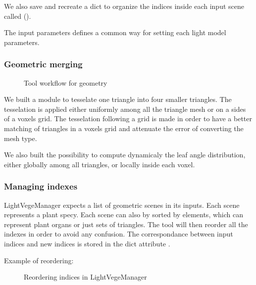 \documentclass[letterpaper,10pt,english]{sphinxmanual}
\let\sphinxpxdimen\pdfpxdimen\else\newdimen\sphinxpxdimen
\begin{document}
\sphinxAtStartPar
We also save and recreate a dict to organize the indices inside each input scene called  ({\hyperref[\detokenize{architecture:indexes}]{}}).

\sphinxAtStartPar
The input parameters defines a common way for setting each light model parameters.


\subsubsection{Geometric merging}
\label{\detokenize{architecture:geometric-merging}}
\begin{figure}[htbp]
\centering
\capstart

\noindent\sphinxincludegraphics[width=731\sphinxpxdimen,height=741\sphinxpxdimen]{{merging}.png}
\caption{Tool workflow for geometry}\label{\detokenize{architecture:id2}}\end{figure}

\sphinxAtStartPar
We built a module to tesselate one triangle into four smaller triangles. The tesselation is applied either uniformly among all the triangle mesh or on a sides of a voxels grid.
The tesselation following a grid is made in order to have a better matching of triangles in a voxels grid and attenuate the error of converting the mesh type.

\sphinxAtStartPar
We also built the possibility to compute dynamicaly the leaf angle distribution, either globally among all triangles, or locally inside each voxel.


\subsubsection{Managing indexes}
\label{\detokenize{architecture:managing-indexes}}\label{\detokenize{architecture:indexes}}
\sphinxAtStartPar
LightVegeManager expects a list of geometric scenes in its inputs. Each scene represents a plant specy.
Each scene can also by sorted by elements, which can represent plant organs or just sets of triangles.
The tool will then reorder all the indexes in order to avoid any confusion.
The correspondance between input indices and new indices is stored in the dict attribute .

\sphinxAtStartPar
Example of reordering:

\begin{figure}[htbp]
\centering
\capstart

\noindent\sphinxincludegraphics[width=451\sphinxpxdimen,height=291\sphinxpxdimen]{{indices}.png}
\caption{Reordering indices in LightVegeManager}\label{\detokenize{architecture:id3}}\end{figure}
\end{document}
